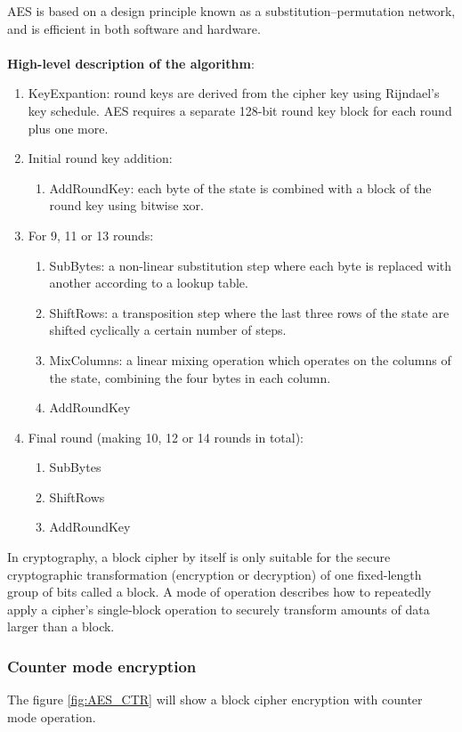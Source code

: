 AES is based on a design principle known as a substitution–permutation network, and is efficient in both software and hardware.
\\
\\
\textbf{High-level description of the algorithm}:
\begin{enumerate}
	\item KeyExpantion: round keys are derived from the cipher key using Rijndael's key schedule. AES requires a separate 128-bit round key block for each round plus one more.
	\item Initial round key addition:
		\begin{enumerate}
			\item AddRoundKey: each byte of the state is combined with a block of the round key using bitwise xor.
		\end{enumerate}
	\item For 9, 11 or 13 rounds:
		\begin{enumerate}
			\item SubBytes: a non-linear substitution step where each byte is replaced with another according to a lookup table.
			\item ShiftRows: a transposition step where the last three rows of the state are shifted cyclically a certain number of steps.
			\item MixColumns: a linear mixing operation which operates on the columns of the state, combining the four bytes in each column.
			\item AddRoundKey
		\end{enumerate}
	\item Final round (making 10, 12 or 14 rounds in total):
		\begin{enumerate}
			\item SubBytes
			\item ShiftRows
			\item AddRoundKey
		\end{enumerate}
\end{enumerate}
\pagebreak
In cryptography, a block cipher by itself is only suitable for the secure cryptographic transformation (encryption or decryption) of one fixed-length group of bits called a block. A mode of operation describes how to repeatedly apply a cipher's single-block operation to securely transform amounts of data larger than a block.
\subsubsection{Counter mode encryption}
The figure \ref{fig:AES_CTR} will show a block cipher encryption with counter mode operation.


